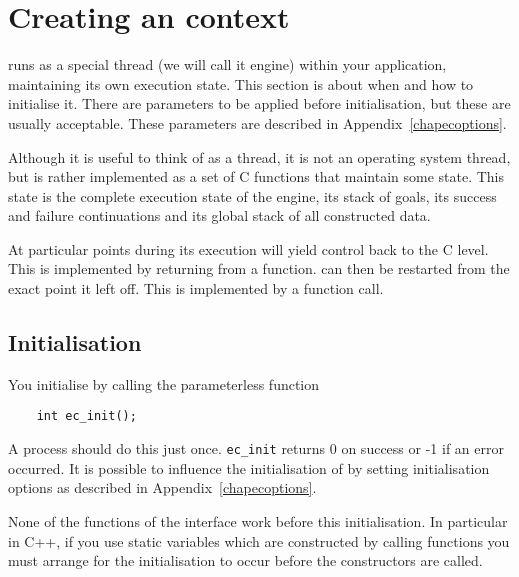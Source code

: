 \section{Creating an {\eclipse} context}

{\eclipse} runs as a special thread (we will call it {\eclipse} engine) within
your application,
maintaining its own execution state. This section is about when and
how to initialise it. There are parameters to be applied before
initialisation, but these are usually acceptable. These parameters are
described in Appendix~\ref{chapecoptions}.

Although it is useful to think of {\eclipse} as a thread, it is not an
operating system thread, but is rather implemented as a set of C
functions that maintain some state. This state is the complete
execution state of the {\eclipse} engine, its stack of goals, its
success and failure continuations and its global stack of all
constructed data.

At particular points during its execution {\eclipse} will yield control
back to the C level. This is implemented by returning from a function.
{\eclipse} can then be restarted from the exact point it left off. This
is implemented by a function call.

\subsection{Initialisation}

You initialise {\eclipse} by calling the parameterless function
\begin{verbatim}
    int ec_init();
\end{verbatim}

A process should do this just once. \verb.ec_init. returns 0 on success or
-1 if an error occurred. It is possible to influence the initialisation of
{\eclipse} by setting initialisation options as described in
Appendix~\ref{chapecoptions}.

None of the functions of the interface work before this initialisation. In
particular in C++, if you use static variables which are
constructed by calling {\eclipse} functions you must arrange for the
initialisation to occur before the constructors are called.



